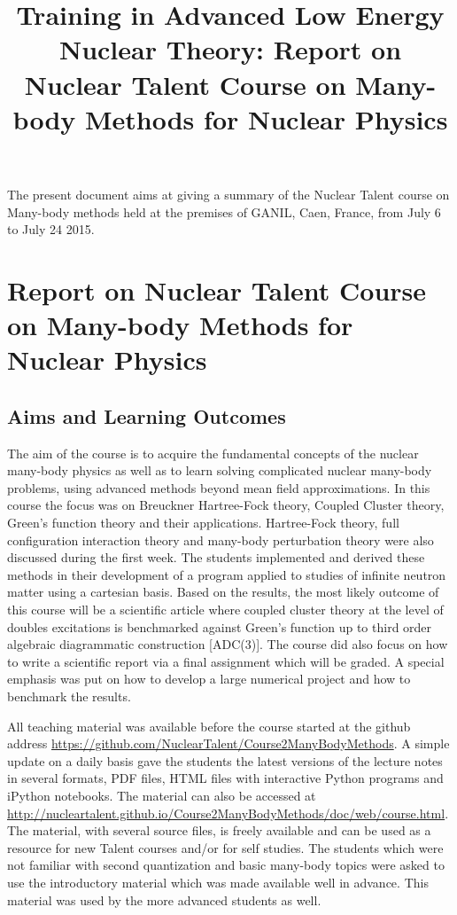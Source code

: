 \documentclass[prc,amsart,english]{revtex4}
\begin{document}
\title{Training in Advanced Low Energy Nuclear Theory: Report on Nuclear Talent Course on Many-body Methods for Nuclear Physics}
\maketitle
The present document aims at giving a summary of the 
Nuclear Talent course on Many-body methods held at the premises of GANIL, Caen, France, from July 6 to July 24 2015. 

\section{Report on Nuclear Talent Course on Many-body Methods for Nuclear Physics}

\subsection{Aims and Learning Outcomes}
The aim of the course is to acquire the fundamental concepts of the nuclear
many-body  physics as well as to learn solving complicated nuclear
many-body problems,  using advanced methods beyond mean field
approximations.  In this course the focus was on Breuckner
Hartree-Fock theory, Coupled Cluster theory, Green's function theory and
their applications. Hartree-Fock theory, full configuration interaction theory and
many-body perturbation theory were also discussed during the first
week.  The students implemented and derived these methods in their
development of a program applied to studies of infinite neutron matter
using a cartesian basis. Based on the results, the most likely outcome
of this course will be a scientific article where coupled cluster theory
at the level of doubles excitations is benchmarked against Green's
function up to third order algebraic diagrammatic construction [ADC(3)]. 
The course did also focus on how to write a scientific report via a final
assignment which will be graded. A special emphasis was put on how 
to develop a large numerical project and how to benchmark the results.

All teaching material was available before the course started at the github address \url{https://github.com/NuclearTalent/Course2ManyBodyMethods}. A simple update on a daily basis gave the students the latest versions of the lecture notes in several formats, PDF files, HTML files with interactive Python programs and iPython notebooks. 
The material can also be accessed at \url{http://nucleartalent.github.io/Course2ManyBodyMethods/doc/web/course.html}.
The material, with several source files,  is freely available and can be used as a resource for new Talent courses and/or for self studies. 
The students which were not familiar with second quantization and basic many-body topics were asked to use the introductory material which was made available well in advance. This material was used by the more advanced students as well. 
\end{document}
